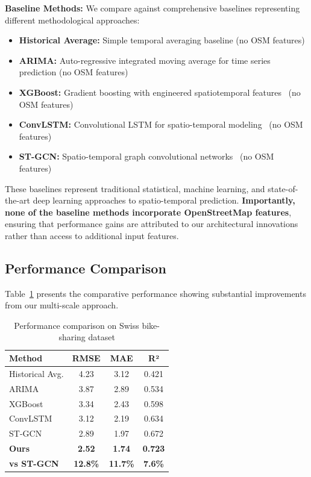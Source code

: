 \documentclass[sigconf,review,nonacm]{acmart}
\begin{document}
\textbf{Baseline Methods:}
We compare against comprehensive baselines representing different methodological approaches:
\begin{itemize}
\item \textbf{Historical Average:} Simple temporal averaging baseline (no OSM features)
\item \textbf{ARIMA:} Auto-regressive integrated moving average for time series prediction (no OSM features)
\item \textbf{XGBoost:} Gradient boosting with engineered spatiotemporal features~\cite{chen2016} (no OSM features)
\item \textbf{ConvLSTM:} Convolutional LSTM for spatio-temporal modeling~\cite{xingjian2015} (no OSM features)
\item \textbf{ST-GCN:} Spatio-temporal graph convolutional networks~\cite{yu2018} (no OSM features)
\end{itemize}

These baselines represent traditional statistical, machine learning, and state-of-the-art deep learning approaches to spatio-temporal prediction. \textbf{Importantly, none of the baseline methods incorporate OpenStreetMap features}, ensuring that performance gains are attributed to our architectural innovations rather than access to additional input features.

\subsection{Performance Comparison}

Table~\ref{tab:main_results} presents the comparative performance showing substantial improvements from our multi-scale approach.

\begin{table}[h]
\centering
\caption{Performance comparison on Swiss bike-sharing dataset}
\label{tab:main_results}
\begin{tabular}{lccc}
\toprule
\textbf{Method} & \textbf{RMSE} & \textbf{MAE} & \textbf{R²} \\
\midrule
Historical Avg. & 4.23 & 3.12 & 0.421 \\
ARIMA & 3.87 & 2.89 & 0.534 \\
XGBoost & 3.34 & 2.43 & 0.598 \\
ConvLSTM & 3.12 & 2.19 & 0.634 \\
ST-GCN & 2.89 & 1.97 & 0.672 \\
\textbf{Ours} & \textbf{2.52} & \textbf{1.74} & \textbf{0.723} \\
\midrule
\textbf{vs ST-GCN} & \textbf{12.8\%} & \textbf{11.7\%} & \textbf{7.6\%} \\
\bottomrule
\end{tabular}
\end{table}
\end{document}
